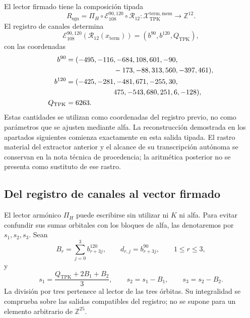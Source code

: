 El lector firmado tiene la composición tipada
\begin{equation}
 R_{\mathrm{sgn}}
 =\Pi_H\circ\mathcal E_{108}^{90,120}\circ\mathcal R_{12}:
 \mathcal X_{\mathrm{TPK}}^{\mathrm{term,mem}}
 \longrightarrow\mathbb Z^{12}.
 \label{eq:k-lector-firmado}
\end{equation}
El registro de canales determina
\[
 \mathcal E_{108}^{90,120}(\mathcal R_{12}(x_{\mathrm{term}}))
 =(b^{90},b^{120},Q_{\mathrm{TPK}}),
\]
con las coordenadas
\begin{align*}
 b^{90}={}&(-495,-116,-684,108,601,-90,\\
            &\hspace{19mm}-173,-88,313,560,-397,461),\\
 b^{120}={}&(-425,-281,-481,671,-255,30,\\
             &\hspace{19mm}475,-543,680,251,6,-128),\\
 Q_{\mathrm{TPK}}={}&6263.
\end{align*}
Estas cantidades se utilizan como coordenadas del registro previo, no
como parámetros que se ajusten mediante alfa. La reconstrucción demostrada
en los apartados siguientes comienza exactamente en esta salida tipada.
El rastro material del extractor anterior y el alcance de su transcripción
autónoma se conservan en la nota técnica de procedencia; la aritmética
posterior no se presenta como sustituto de ese rastro.

\subsection{Del registro de canales al vector firmado}
\label{subsec:k-pi-h}

El lector armónico \(\Pi_H\) puede escribirse sin utilizar ni \(K\) ni
alfa. Para evitar confundir sus sumas orbitales con los bloques de alfa,
las denotaremos por \(s_1,s_2,s_3\). Sean
\[
 B_r=\sum_{j=0}^{3}b^{120}_{r+3j},\qquad
 d_{r,j}=b^{90}_{r+3j},\qquad1\leq r\leq3,
\]
y
\begin{equation}
 s_1=\frac{Q_{\mathrm{TPK}}+2B_1+B_2}{3},\qquad
 s_2=s_1-B_1,\qquad s_3=s_2-B_2.
 \label{eq:k-sumas-armonicas}
\end{equation}
La división por tres pertenece al lector de las tres órbitas. Su
integralidad se comprueba sobre las salidas compatibles del registro; no
se supone para un elemento arbitrario de \(\mathbb Z^{25}\).


